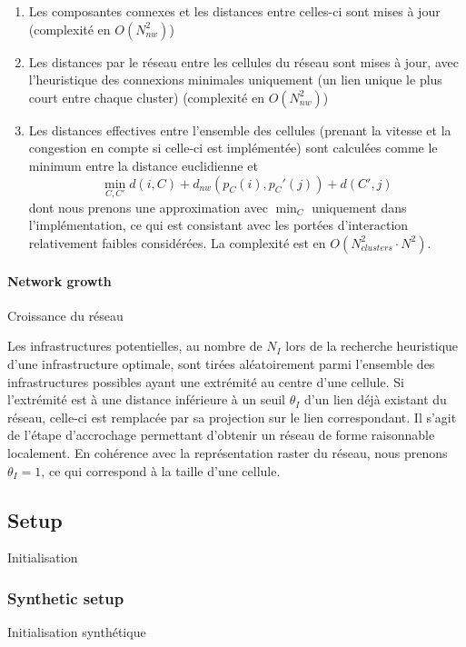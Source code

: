 {\begin{enumerate}
\begin{itemize}
	\end{itemize}
	\item Les composantes connexes et les distances entre celles-ci sont mises à jour (complexité en $O(N_{nw}^2)$)
	\item Les distances par le réseau entre les cellules du réseau sont mises à jour, avec l'heuristique des connexions minimales uniquement (un lien unique le plus court entre chaque cluster) (complexité en $O(N_{nw}^2)$)
	\item Les distances effectives entre l'ensemble des cellules (prenant la vitesse et la congestion en compte si celle-ci est implémentée) sont calculées comme le minimum entre la distance euclidienne et 
	\[\min_{C,C'}{d(i,C)+d_{nw}(p_C(i),p_C'(j))+d(C',j)}\]
	dont nous prenons une approximation avec $\min_C$ uniquement dans l'implémentation, ce qui est consistant avec les portées d'interaction relativement faibles considérées. La complexité est en $O(N_{clusters}^2\cdot N^2)$.
\end{enumerate}
}


\paragraph{Network growth}{Croissance du réseau}


Les infrastructures potentielles, au nombre de $N_I$ lors de la recherche heuristique d'une infrastructure optimale, sont tirées aléatoirement parmi l'ensemble des infrastructures possibles ayant une extrémité au centre d'une cellule. Si l'extrémité est à une distance inférieure à un seuil $\theta_I$ d'un lien déjà existant du réseau, celle-ci est remplacée par sa projection sur le lien correspondant. Il s'agit de l'étape d'accrochage permettant d'obtenir un réseau de forme raisonnable localement. En cohérence avec la représentation raster du réseau, nous prenons $\theta_I = 1$, ce qui correspond à la taille d'une cellule. 






\subsection{Setup}{Initialisation}


\subsubsection{Synthetic setup}{Initialisation synthétique}

